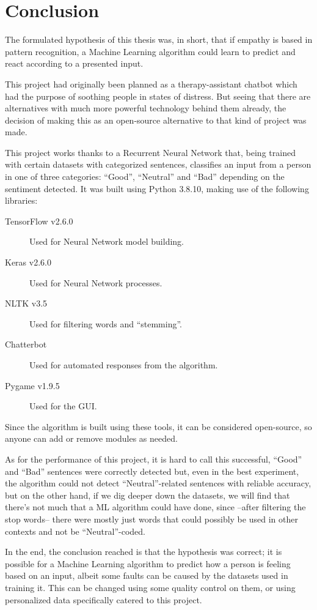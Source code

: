 \chapter{Conclusion}
\label{ch6}
The formulated hypothesis of this thesis was, in short, that if empathy is based in pattern recognition, a Machine Learning algorithm could learn to predict and react according to a presented input.

This project had originally been planned as a therapy-assistant chatbot which had the purpose of soothing people in states of distress. But seeing that there are alternatives with much more powerful technology behind them already, the decision of making this as an open-source alternative to that kind of project was made.

This project works thanks to a Recurrent Neural Network that, being trained with certain datasets with categorized sentences, classifies an input from a person in one of three categories: ``Good'', ``Neutral'' and ``Bad'' depending on the sentiment detected. It was built using Python 3.8.10, making use of the following libraries:
\begin{description}
	\item[TensorFlow v2.6.0]{Used for Neural Network model building.}
	\item[Keras v2.6.0]{Used for Neural Network processes.}
	\item[NLTK v3.5]{Used for filtering words and ``stemming''.}
	\item[Chatterbot]{Used for automated responses from the algorithm.}
	\item[Pygame v1.9.5]{Used for the GUI.}
\end{description}

Since the algorithm is built using these tools, it can be considered open-source, so anyone can add or remove modules as needed.

As for the performance of this project, it is hard to call this successful, ``Good'' and ``Bad'' sentences were correctly detected but, even in the best experiment, the algorithm could not detect ``Neutral''-related sentences with reliable accuracy, but on the other hand, if we dig deeper down the datasets, we will find that there's not much that a ML algorithm could have done, since --after filtering the stop words-- there were mostly just words that could possibly be used in other contexts and not be ``Neutral''-coded.

In the end, the conclusion reached is that the hypothesis was correct; it is possible for a Machine Learning algorithm to predict how a person is feeling based on an input, albeit some faults can be caused by the datasets used in training it. This can be changed using some quality control on them, or using personalized data specifically catered to this project.

